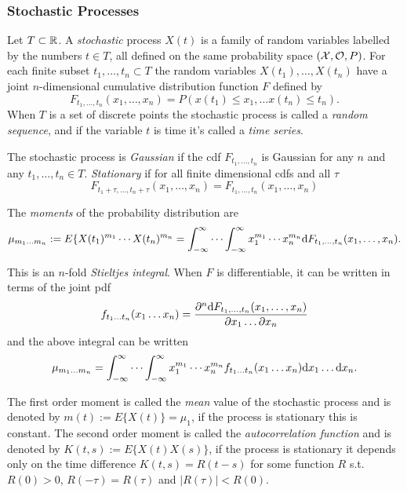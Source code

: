 \subsubsection{Stochastic Processes}
Let $T\subset \mathbb{R}$. A \textit{stochastic} process $X(t)$ is a family of random variables labelled by the numbers $t\in T$, all defined on the same probability space $(\mathcal{X}, \mathcal{O}, P)$. For each finite subset ${t_1, \ldots, t_n} \subset T$ the random variables $ X(t_1), \ldots, X(t_n)$ have a joint $n$-dimensional cumulative distribution function $F$ defined by
\begin{equation}
F_{t_1, \ldots, t_n}(x_1,\ldots,x_n)=P(x(t_1)\leq x_1, \ldots x(t_n)\leq t_n).
\end{equation}
When $T$ is a set of discrete points the stochastic process is called a \textit{random sequence}, and if the variable $t$ is time it's called a \textit{time series}. 

The stochastic process is \textit{Gaussian} if the cdf $F_{t_1, \ldots, t_n}$ is Gaussian for any $n$ and any $t_1, \ldots, t_n \in T$. \textit{Stationary} if for all finite dimensional cdfs and all $\tau$
\begin{equation}
F_{t_1+\tau, \ldots, t_n+\tau}(x_1,\ldots,x_n)=F_{t_1, \ldots, t_n}(x_1,\ldots,x_n)
\end{equation}

The \textit{moments} of the probability distribution are 
\begin{equation}
\mu_{m_1 \ldots m_n} := E\{X(t_1)^{m_1}\cdots X(t_n)^{m_n} =\int_{-\infty}^{\infty}\cdots \int_{-\infty}^{\infty} x_1^{m_1}\cdots x_n^{m_n} {\mbox{d}} F_{t_1, \ldots, t_n}(x_1,\ldots,x_n).
\end{equation}


This is an $n$-fold \textit{Stieltjes integral}. When $F$ is differentiable, it can be written in terms of the joint pdf 
\begin{equation}
f_{t_1\ldots t_n}(x_1\ldots x_n) = \frac{{\partial}^n {\mbox{d}} F_{t_1, \ldots, t_n}(x_1,\ldots,x_n)}{{\partial} x_1 \ldots {\partial} x_n} 
\end{equation}
and the above integral can be written 
\begin{equation}
\mu_{m_1 \ldots m_n} = \int_{-\infty}^{\infty}\cdots \int_{-\infty}^{\infty}x_1^{m_1}\cdots x_n^{m_n} f_{t_1\ldots t_n}(x_1\ldots x_n) {\mbox{d}} x_1 \ldots {\mbox{d}} x_n.
\end{equation}


 The first order moment is called the \textit{mean} value of the stochastic process and is denoted by $m(t) := E\{X(t)\} =\mu_1$, if the process is stationary this is constant. The second order moment is called the \textit{autocorrelation function} and is denoted by $K(t,s) := E\{X(t)X(s)\}$, if the process is stationary it depends only on the time difference $K(t,s)=R(t-s)$ for some function $R$ s.t. $R(0)>0$, $R(-\tau)=R(\tau)$ and $|R(\tau)|<R(0)$.

